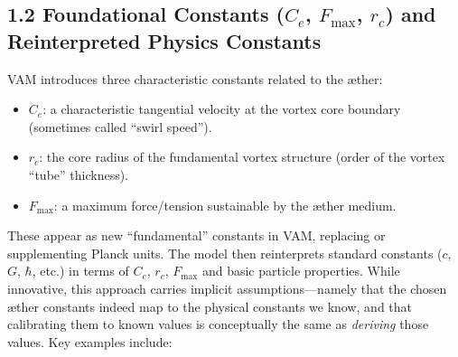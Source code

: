 \documentclass[a4paper,12pt]{article}
\begin{document}
\subsection*{1.2 Foundational Constants ($C_e$, $F_{\max}$, $r_c$) and Reinterpreted Physics Constants}

VAM introduces three characteristic constants related to the æther:
\begin{itemize}
        \item $C_e$: a characteristic tangential velocity at the vortex core boundary (sometimes called ``swirl speed'').
        \item $r_c$: the core radius of the fundamental vortex structure (order of the vortex ``tube'' thickness).
        \item $F_{\max}$: a maximum force/tension sustainable by the æther medium.
\end{itemize}

    These appear as new ``fundamental'' constants in VAM, replacing or supplementing Planck units. The model then reinterprets standard constants ($c$, $G$, $\hbar$, etc.) in terms of $C_e$, $r_c$, $F_{\max}$ and basic particle properties. While innovative, this approach carries implicit assumptions---namely that the chosen æther constants indeed map to the physical constants we know, and that calibrating them to known values is conceptually the same as \emph{deriving} those values. Key examples include:
\end{document}

